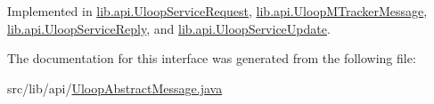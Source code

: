 Implemented in \hyperlink{classlib_1_1api_1_1UloopServiceRequest_a297690e00aed1f79499de2c9095fe52c}{lib.\+api.\+Uloop\+Service\+Request}, \hyperlink{classlib_1_1api_1_1UloopMTrackerMessage_ad8747254f5616590148266b72b088421}{lib.\+api.\+Uloop\+M\+Tracker\+Message}, \hyperlink{classlib_1_1api_1_1UloopServiceReply_a825bbcd3250cc8ac980f3eda449c482f}{lib.\+api.\+Uloop\+Service\+Reply}, and \hyperlink{classlib_1_1api_1_1UloopServiceUpdate_a92cf6fa47379c50f0117838e97e7eb9d}{lib.\+api.\+Uloop\+Service\+Update}.



The documentation for this interface was generated from the following file\+:\begin{DoxyCompactItemize}
\item 
src/lib/api/\hyperlink{UloopAbstractMessage_8java}{Uloop\+Abstract\+Message.\+java}\end{DoxyCompactItemize}
